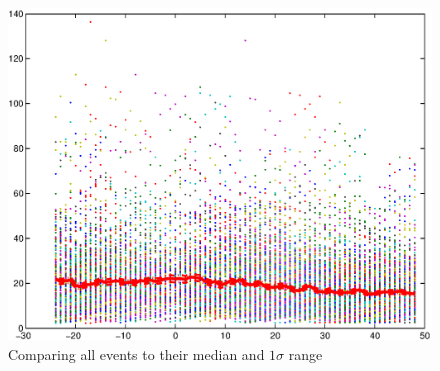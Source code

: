 \documentclass[10pt,twocolumn]{article}
\begin{document}
\begin{figure}[htp]
\centering
\includegraphics[scale=0.9]{paperfigures/allstorms.eps}
\caption{Comparing all events to their median and $1\sigma$ range}
\label{allstorms}
\end{figure}
\clearpage
\end{document}
